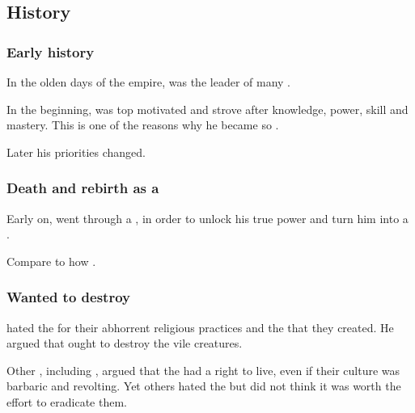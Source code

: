 









\subsection{History}





\subsubsection{Early history}
In the olden days of the \draconian{} empire, \Nexagglachel was the leader of many \dragons. 

In the beginning, \Ishnaruchaefir{} was top motivated and strove after knowledge, power, skill and mastery. 
This is one of the reasons why he became so . 

Later his priorities changed. 







\subsubsection{Death and rebirth as a \dragon}
Early on, \Ishnaruchaefir{} went through a , in order to unlock his true power and turn him into a {\dragon}.

Compare to how .





\subsubsection{Wanted to destroy \humans}
\Ishnaruchaefir hated the \humans for their abhorrent religious practices and the  that they created. 
He argued that \dragonkind ought to destroy the vile creatures. 

Other \dragons, including \Rystessakhin, argued that the \humans had a right to live, even if their culture was barbaric and revolting. 
Yet others hated the \humans but did not think it was worth the effort to eradicate them. 





